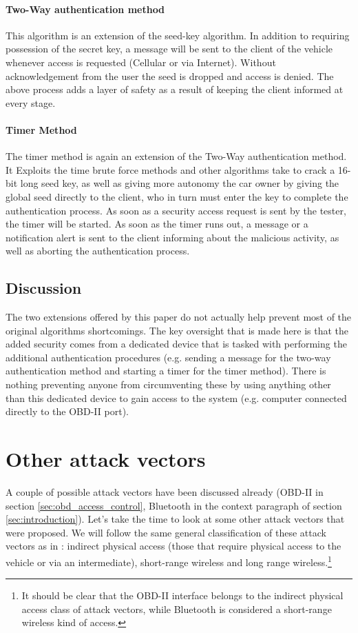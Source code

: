 \paragraph{Two-Way authentication method}
This algorithm is an extension of the seed-key algorithm. In addition to requiring possession of the secret key, a message will be sent to the client of the vehicle whenever access is requested (Cellular or via Internet). Without acknowledgement from the user the seed is dropped and access is denied. The above process adds a layer of safety as a result of keeping the client informed at every stage.

\paragraph{Timer Method}  
The timer method is again an extension of the Two-Way authentication method. It Exploits the time brute force methods and other algorithms take to crack a 16-bit long seed key, as well as giving more autonomy the car owner by giving the global seed directly to the client, who in turn must enter the key to complete the authentication process. As soon as a security access request is sent by the tester, the timer will be started. As soon as the timer runs out, a message or a notification alert is sent to the client informing about the malicious activity, as well as aborting the authentication process. 

\subsection{Discussion} 
The two extensions offered by this paper do not actually help prevent most of the original algorithms shortcomings. The key oversight that is made here is that the added security comes from a dedicated device that is tasked with performing the additional authentication procedures (e.g. sending a message for the two-way authentication method and starting a timer for the timer method). There is nothing preventing anyone from circumventing these by using anything other than this dedicated device to gain access to the system (e.g. computer connected directly to the OBD-II port). 

\section{Other attack vectors}
\label{sec:other_attack_vectors}

A couple of possible attack vectors have been discussed already (OBD-II in section \ref{sec:obd_access_control}, Bluetooth in the context paragraph of section \ref{sec:introduction}). Let's take the time to look at some other attack vectors that were proposed. We will follow the same general classification of these attack vectors as in \cite{Kosher}: indirect physical access (those that require physical access to the vehicle or via an intermediate), short-range wireless and long range wireless.\footnote{It should be clear that the OBD-II interface belongs to the indirect physical access class of attack vectors, while Bluetooth is considered a short-range wireless kind of access.}


